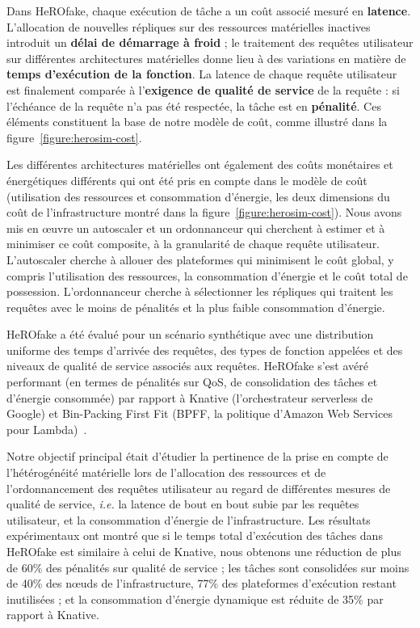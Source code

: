 Dans HeROfake, chaque exécution de tâche a un coût associé mesuré en \textbf{latence}. L'allocation de nouvelles répliques sur des ressources matérielles inactives introduit un \textbf{délai de démarrage à froid} ; le traitement des requêtes utilisateur sur différentes architectures matérielles donne lieu à des variations en matière de \textbf{temps d'exécution de la fonction}. La latence de chaque requête utilisateur est finalement comparée à l'\textbf{exigence de qualité de service} de la requête : si l'échéance de la requête n'a pas été respectée, la tâche est en \textbf{pénalité}. Ces éléments constituent la base de notre modèle de coût, comme illustré dans la figure~\ref{figure:herosim-cost}.

Les différentes architectures matérielles ont également des coûts monétaires et énergétiques différents qui ont été pris en compte dans le modèle de coût (utilisation des ressources et consommation d'énergie, les deux dimensions du coût de l'infrastructure montré dans la figure~\ref{figure:herosim-cost}). Nous avons mis en œuvre un autoscaler et un ordonnanceur qui cherchent à estimer et à minimiser ce coût composite, à la granularité de chaque requête utilisateur. L'autoscaler cherche à allouer des plateformes qui minimisent le coût global, y compris l'utilisation des ressources, la consommation d'énergie et le coût total de possession. L'ordonnanceur cherche à sélectionner les répliques qui traitent les requêtes avec le moins de pénalités et la plus faible consommation d'énergie.

HeROfake a été évalué pour un scénario synthétique avec une distribution uniforme des temps d'arrivée des requêtes, des types de fonction appelées et des niveaux de qualité de service associés aux requêtes. HeROfake s'est avéré performant (en termes de pénalités sur \gls{QoS}, de consolidation des tâches et d'énergie consommée) par rapport à Knative (l'orchestrateur serverless de Google) et Bin-Packing First Fit (\gls{BPFF}, la politique d'Amazon Web Services pour Lambda)~\cite{aws-lambda, herofake}.

Notre objectif principal était d'étudier la pertinence de la prise en compte de l'hétérogénéité matérielle lors de l'allocation des ressources et de l'ordonnancement des requêtes utilisateur au regard de différentes mesures de qualité de service, \textit{i.e.} la latence de bout en bout subie par les requêtes utilisateur, et la consommation d'énergie de l'infrastructure. Les résultats expérimentaux ont montré que si le temps total d'exécution des tâches dans HeROfake est similaire à celui de Knative, nous obtenons une réduction de plus de 60\% des pénalités sur qualité de service ; les tâches sont consolidées sur moins de 40\% des nœuds de l'infrastructure, 77\% des plateformes d'exécution restant inutilisées ; et la consommation d'énergie dynamique est réduite de 35\% par rapport à Knative.

